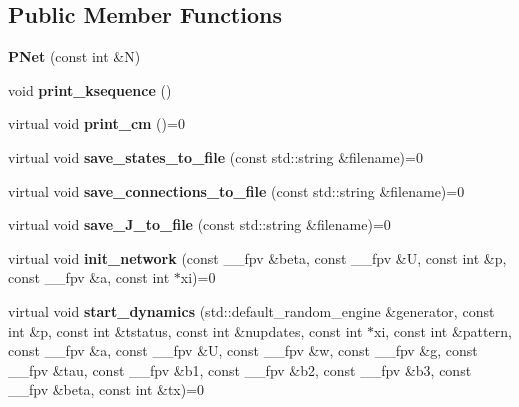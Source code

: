 \subsection*{Public Member Functions}
\begin{DoxyCompactItemize}
\item 
\hypertarget{class_p_net_ae7bb66e9b6e3cc8bebf69f0acc467978}{}{\bfseries P\+Net} (const int \&N)\label{class_p_net_ae7bb66e9b6e3cc8bebf69f0acc467978}

\item 
\hypertarget{class_p_net_af8319c3b3ec476d5008df5fe45c3544d}{}void {\bfseries print\+\_\+ksequence} ()\label{class_p_net_af8319c3b3ec476d5008df5fe45c3544d}

\item 
\hypertarget{class_p_net_a0f0c008ac7f00564bfdedfd3febd3602}{}virtual void {\bfseries print\+\_\+cm} ()=0\label{class_p_net_a0f0c008ac7f00564bfdedfd3febd3602}

\item 
\hypertarget{class_p_net_a2cac2b992ff0b0520f5dbb1a029676b1}{}virtual void {\bfseries save\+\_\+states\+\_\+to\+\_\+file} (const std\+::string \&filename)=0\label{class_p_net_a2cac2b992ff0b0520f5dbb1a029676b1}

\item 
\hypertarget{class_p_net_aad8dbda7540a1ed7d3fa142583770c0d}{}virtual void {\bfseries save\+\_\+connections\+\_\+to\+\_\+file} (const std\+::string \&filename)=0\label{class_p_net_aad8dbda7540a1ed7d3fa142583770c0d}

\item 
\hypertarget{class_p_net_a98feeb763aa03d366e6bf5b05c240f25}{}virtual void {\bfseries save\+\_\+\+J\+\_\+to\+\_\+file} (const std\+::string \&filename)=0\label{class_p_net_a98feeb763aa03d366e6bf5b05c240f25}

\item 
\hypertarget{class_p_net_a63efd6e2d7c5a38e0a6ae77af655a405}{}virtual void {\bfseries init\+\_\+network} (const \+\_\+\+\_\+fpv \&beta, const \+\_\+\+\_\+fpv \&U, const int \&p, const \+\_\+\+\_\+fpv \&a, const int $\ast$xi)=0\label{class_p_net_a63efd6e2d7c5a38e0a6ae77af655a405}

\item 
\hypertarget{class_p_net_afb427ff3050f26969782aec6bc76a5a7}{}virtual void {\bfseries start\+\_\+dynamics} (std\+::default\+\_\+random\+\_\+engine \&generator, const int \&p, const int \&tstatus, const int \&nupdates, const int $\ast$xi, const int \&pattern, const \+\_\+\+\_\+fpv \&a, const \+\_\+\+\_\+fpv \&U, const \+\_\+\+\_\+fpv \&w, const \+\_\+\+\_\+fpv \&g, const \+\_\+\+\_\+fpv \&tau, const \+\_\+\+\_\+fpv \&b1, const \+\_\+\+\_\+fpv \&b2, const \+\_\+\+\_\+fpv \&b3, const \+\_\+\+\_\+fpv \&beta, const int \&tx)=0\label{class_p_net_afb427ff3050f26969782aec6bc76a5a7}

\end{DoxyCompactItemize}
